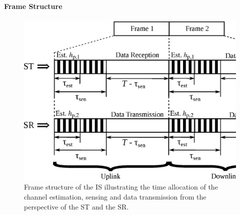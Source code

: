 \paragraph{Frame Structure}
\begin{figure}[!ht]
\centering
\includegraphics[width = \columnwidth]{figures/Frame_Structure}
\caption{Frame structure of the IS illustrating the time allocation of the channel estimation, sensing and data transmission from the perspective of the ST and the SR.} %
\label{fig_IS:fs}
\end{figure}
